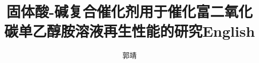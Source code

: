 \documentclass[master, anonymous]{hnuthesis}
\title{固体酸-碱复合催化剂用于催化富二氧化碳单乙醇胺溶液再生性能的研究English}
\author{郭靖}
\begin{document}
\maketitle


\tableofcontents
\begingroup
    \renewcommand*{\addvspace}[1]{}
        \listoffigures
        \newpage

        \listoftables
        \newpage
\endgroup

\mainmatter





\appendix


\backmatter



\end{document}

